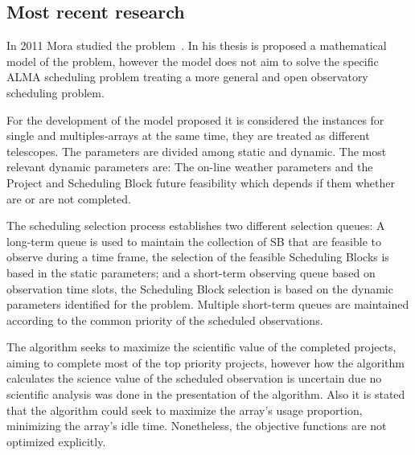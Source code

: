 \subsection{Most recent research}
In 2011 Mora studied the problem~\cite{mora11}. In his thesis is proposed a mathematical model of the problem, however the model does not aim to solve the specific ALMA scheduling problem treating a more general and open observatory scheduling problem. 

For the development of the model proposed it is considered the instances for single and multiples-arrays at the same time, they are treated as different telescopes. The parameters are divided among static and dynamic. The most relevant dynamic parameters are: The on-line weather parameters and the Project and Scheduling Block future feasibility which depends if them whether are or are not completed.

The scheduling selection process establishes two different selection queues: A long-term queue is used to maintain the collection of SB that are feasible to observe during a time frame, the selection of the feasible Scheduling Blocks is based in the static parameters; and a short-term observing queue based on observation time slots, the Scheduling Block selection is based on the dynamic parameters identified for the problem. Multiple short-term queues are maintained according to the common priority of the scheduled observations.

The algorithm seeks to maximize the scientific value of the completed projects, aiming to complete most of the top priority projects, however how the algorithm calculates the science value of the scheduled observation is uncertain due no scientific analysis was done in the presentation of the algorithm. Also it is stated that the algorithm could seek to maximize the array's usage proportion, minimizing the array's idle time. Nonetheless, the objective functions are not optimized explicitly.